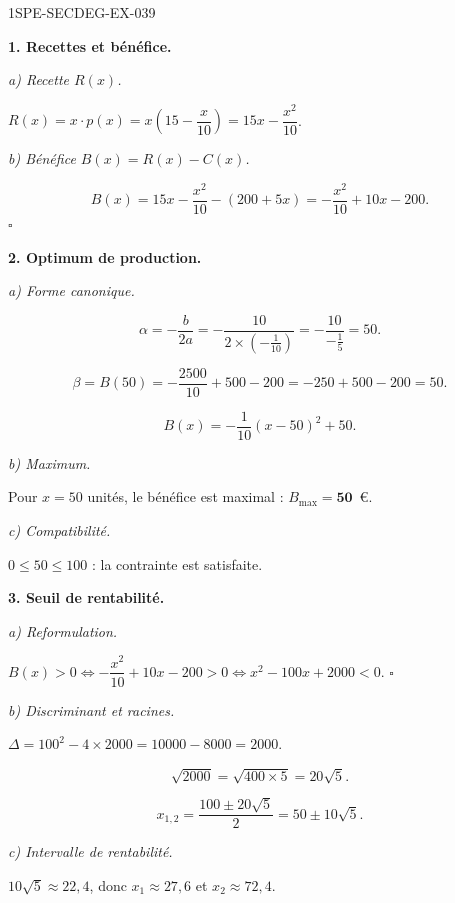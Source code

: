 \begin{corrige}{1SPE-SECDEG-EX-039}

\textbf{1. Recettes et bénéfice.}

\textit{a) Recette $R(x)$.}


$R(x) = x \cdot p(x) = x\!\left(15 - \dfrac{x}{10}\right) = 15x - \dfrac{x^2}{10}$.

\textit{b) Bénéfice $B(x) = R(x) - C(x)$.}

\[B(x) = 15x - \frac{x^2}{10} - (200 + 5x) = -\frac{x^2}{10} + 10x - 200.\] \hfill $\square$

\medskip
\textbf{2. Optimum de production.}

\textit{a) Forme canonique.}


\[\alpha = -\frac{b}{2a} = -\frac{10}{2 \times (-\frac{1}{10})} = -\frac{10}{-\frac{1}{5}} = 50.\]

\[\beta = B(50) = -\frac{2500}{10} + 500 - 200 = -250 + 500 - 200 = 50.\]

\[B(x) = -\frac{1}{10}(x - 50)^2 + 50.\]

\textit{b) Maximum.}

Pour $x = 50$ unités, le bénéfice est maximal : $B_{\max} = \mathbf{50}$~\euro.

\textit{c) Compatibilité.}

$0 \leqslant 50 \leqslant 100$ : la contrainte est satisfaite.

\medskip
\textbf{3. Seuil de rentabilité.}

\textit{a) Reformulation.}


$B(x) > 0 \iff -\dfrac{x^2}{10} + 10x - 200 > 0 \iff x^2 - 100x + 2000 < 0$. \hfill $\square$

\textit{b) Discriminant et racines.}

$\Delta = 100^2 - 4 \times 2000 = 10000 - 8000 = 2000$.

\[\sqrt{2000} = \sqrt{400 \times 5} = 20\sqrt{5}.\]

\[x_{1,2} = \frac{100 \pm 20\sqrt{5}}{2} = 50 \pm 10\sqrt{5}.\]

\textit{c) Intervalle de rentabilité.}

$10\sqrt{5} \approx 22{,}4$, donc $x_1 \approx 27{,}6$ et $x_2 \approx 72{,}4$.


\end{corrige}
